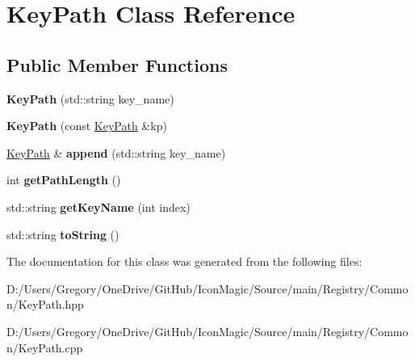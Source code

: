 \hypertarget{class_key_path}{}\section{Key\+Path Class Reference}
\label{class_key_path}
\subsection*{Public Member Functions}
\begin{DoxyCompactItemize}
\item 
\hypertarget{class_key_path_ae333110e571e2126ce2e9a19f4900ab7}{}{\bfseries Key\+Path} (std\+::string key\+\_\+name)\label{class_key_path_ae333110e571e2126ce2e9a19f4900ab7}

\item 
\hypertarget{class_key_path_af70143f36c7946a29f89e4cc4e5b11e9}{}{\bfseries Key\+Path} (const \hyperlink{class_key_path}{Key\+Path} \&kp)\label{class_key_path_af70143f36c7946a29f89e4cc4e5b11e9}

\item 
\hypertarget{class_key_path_a05e16fcea85250d3d350700246e677b4}{}\hyperlink{class_key_path}{Key\+Path} \& {\bfseries append} (std\+::string key\+\_\+name)\label{class_key_path_a05e16fcea85250d3d350700246e677b4}

\item 
\hypertarget{class_key_path_a3c43f10b8630dfb6fbd3709fb26447f8}{}int {\bfseries get\+Path\+Length} ()\label{class_key_path_a3c43f10b8630dfb6fbd3709fb26447f8}

\item 
\hypertarget{class_key_path_a3a69deab570f0025d50c55a8abea0e2d}{}std\+::string {\bfseries get\+Key\+Name} (int index)\label{class_key_path_a3a69deab570f0025d50c55a8abea0e2d}

\item 
\hypertarget{class_key_path_a1290b998befc7e45d650f3e3fc5cbd35}{}std\+::string {\bfseries to\+String} ()\label{class_key_path_a1290b998befc7e45d650f3e3fc5cbd35}

\end{DoxyCompactItemize}


The documentation for this class was generated from the following files\+:\begin{DoxyCompactItemize}
\item 
D\+:/\+Users/\+Gregory/\+One\+Drive/\+Git\+Hub/\+Icon\+Magic/\+Source/main/\+Registry/\+Common/Key\+Path.\+hpp\item 
D\+:/\+Users/\+Gregory/\+One\+Drive/\+Git\+Hub/\+Icon\+Magic/\+Source/main/\+Registry/\+Common/Key\+Path.\+cpp\end{DoxyCompactItemize}
